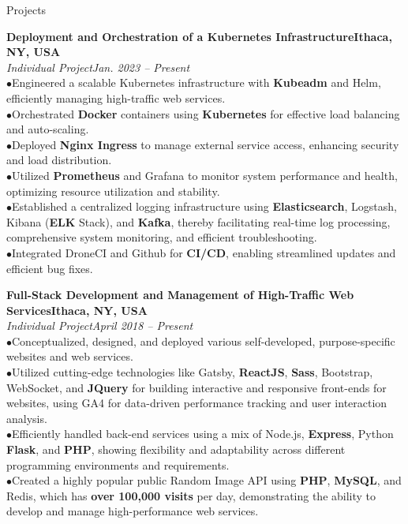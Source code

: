 \documentclass{resume} %
\begin{document}
\begin{rSection}{Projects}


{\bf Deployment and Orchestration of a Kubernetes Infrastructure}\hfill{\textbf{Ithaca, NY, USA}}
\\{\em Individual Project}\hfill {\em Jan. 2023 -- Present}
\\ $ \bullet $Engineered a scalable Kubernetes infrastructure with \textbf{Kubeadm} and Helm, efficiently managing high-traffic web services.
\\ $ \bullet $Orchestrated \textbf{Docker} containers using \textbf{Kubernetes} for effective load balancing and auto-scaling.
\\ $ \bullet $Deployed \textbf{Nginx Ingress} to manage external service access, enhancing security and load distribution.
\\ $ \bullet $Utilized \textbf{Prometheus} and Grafana to monitor system performance and health, optimizing resource utilization and stability.
\\ $ \bullet $Established a centralized logging infrastructure using \textbf{Elasticsearch}, Logstash, Kibana (\textbf{ELK} Stack), and \textbf{Kafka}, thereby facilitating real-time log processing, comprehensive system monitoring, and efficient troubleshooting.
\\ $ \bullet $Integrated DroneCI and Github for \textbf{CI/CD}, enabling streamlined updates and efficient bug fixes.



{\bf Full-Stack Development and Management of High-Traffic Web Services}\hfill{\textbf{Ithaca, NY, USA}}
\\{\em Individual Project}\hfill {\em April 2018 -- Present}
\\ $ \bullet $Conceptualized, designed, and deployed various self-developed, purpose-specific websites and web services.
\\ $ \bullet $Utilized cutting-edge technologies like Gatsby, \textbf{ReactJS}, \textbf{Sass}, Bootstrap, WebSocket, and \textbf{JQuery} for building interactive and responsive front-ends for websites, using GA4 for data-driven performance tracking and user interaction analysis.
\\ $ \bullet $Efficiently handled back-end services using a mix of Node.js, \textbf{Express}, Python \textbf{Flask}, and \textbf{PHP}, showing flexibility and adaptability across different programming environments and requirements.
\\ $ \bullet $Created a highly popular public Random Image API using \textbf{PHP}, \textbf{MySQL}, and Redis, which has \textbf{over 100,000 visits} per day, demonstrating the ability to develop and manage high-performance web services.


\end{rSection}
\end{document}
